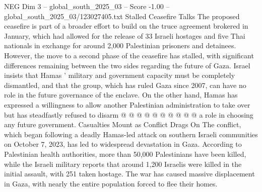 \begin{textsample}{NEG Dim 3 – global\_south\_2025\_03 – Score -1.00 – global\_south\_2025\_03/123027405.txt}
Stalled Ceasefire Talks The proposed ceasefire is part of a broader effort to build on the truce agreement brokered in January, which had allowed for the release of 33 Israeli hostages and five Thai nationals in exchange for around 2,000 Palestinian prisoners and detainees.
However, the move to a second phase of the ceasefire has stalled, with significant differences remaining between the two sides regarding the future of Gaza.
Israel insists that Hamas ' military and government capacity must be completely dismantled, and that the group, which has ruled Gaza since 2007, can have no role in the future governance of the enclave.
On the other hand, Hamas has expressed a willingness to allow another Palestinian administration to take over but has steadfastly refused to disarm @ @ @ @ @ @ @ @ @ @ a role in choosing any future government.
Casualties Mount as Conflict Drags On The conflict, which began following a deadly Hamas-led attack on southern Israeli communities on October 7, 2023, has led to widespread devastation in Gaza.
According to Palestinian health authorities, more than 50,000 Palestinians have been killed, while the Israeli military reports that around 1,200 Israelis were killed in the initial assault, with 251 taken hostage.
The war has caused massive displacement in Gaza, with nearly the entire population forced to flee their homes.

\end{textsample}
